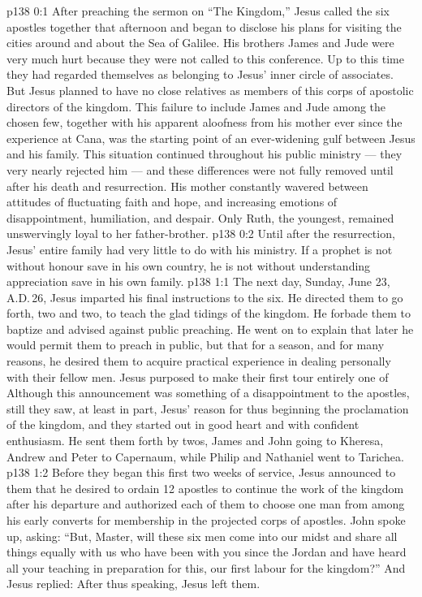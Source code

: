\author{Midwayer Commission}
\vs p138 0:1 After preaching the sermon on “The Kingdom,” Jesus called the six apostles together that afternoon and began to disclose his plans for visiting the cities around and about the Sea of Galilee. His brothers James and Jude were very much hurt because they were not called to this conference. Up to this time they had regarded themselves as belonging to Jesus’ inner circle of associates. But Jesus planned to have no close relatives as members of this corps of apostolic directors of the kingdom. This failure to include James and Jude among the chosen few, together with his apparent aloofness from his mother ever since the experience at Cana, was the starting point of an ever\hyp{}widening gulf between Jesus and his family. This situation continued throughout his public ministry --- they very nearly rejected him --- and these differences were not fully removed until after his death and resurrection. His mother constantly wavered between attitudes of fluctuating faith and hope, and increasing emotions of disappointment, humiliation, and despair. Only Ruth, the youngest, remained unswervingly loyal to her father\hyp{}brother.
\vs p138 0:2 Until after the resurrection, Jesus’ entire family had very little to do with his ministry. If a prophet is not without honour save in his own country, he is not without understanding appreciation save in his own family.
\vs p138 1:1 The next day, Sunday, June 23, A.D.\,26, Jesus imparted his final instructions to the six. He directed them to go forth, two and two, to teach the glad tidings of the kingdom. He forbade them to baptize and advised against public preaching. He went on to explain that later he would permit them to preach in public, but that for a season, and for many reasons, he desired them to acquire practical experience in dealing personally with their fellow men. Jesus purposed to make their first tour entirely one of  Although this announcement was something of a disappointment to the apostles, still they saw, at least in part, Jesus’ reason for thus beginning the proclamation of the kingdom, and they started out in good heart and with confident enthusiasm. He sent them forth by twos, James and John going to Kheresa, Andrew and Peter to Capernaum, while Philip and Nathaniel went to Tarichea.
\vs p138 1:2 Before they began this first two weeks of service, Jesus announced to them that he desired to ordain 12 apostles to continue the work of the kingdom after his departure and authorized each of them to choose one man from among his early converts for membership in the projected corps of apostles. John spoke up, asking: “But, Master, will these six men come into our midst and share all things equally with us who have been with you since the Jordan and have heard all your teaching in preparation for this, our first labour for the kingdom?” And Jesus replied:  After thus speaking, Jesus left them.
